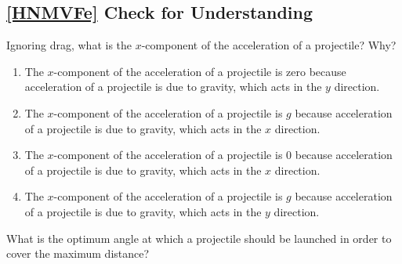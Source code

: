 \documentclass[main-physics.tex]{subfiles}
\begin{document}
\begin{center}
\end{center}

\endsolution

\subsection*{\ref{HNMVFe} Check for Understanding}

\begin{exercise} \label{DnqDpu}
    Ignoring drag, what is the $x$-component of the acceleration of a projectile? Why?
\end{exercise}

\begin{enumerate}[label=\Alph*.]
    \item The $x$-component of the acceleration of a projectile is zero because acceleration of a projectile is due to gravity, which acts in the $y$ direction.
    \item The $x$-component of the acceleration of a projectile is $g$ because acceleration of a projectile is due to gravity, which acts in the $x$ direction.
    \item The $x$-component of the acceleration of a projectile is 0 because acceleration of a projectile is due to gravity, which acts in the $x$ direction.
    \item The $x$-component of the acceleration of a projectile is $g$ because acceleration of a projectile is due to gravity, which acts in the $y$ direction.
\end{enumerate}

\begin{exercise} \label{QsBUvP}
    What is the optimum angle at which a projectile should be launched in order to cover the maximum distance?
\end{exercise}
\end{document}
